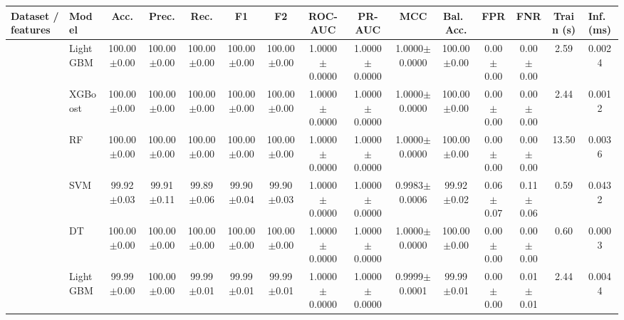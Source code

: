 \begin{tabular}{@{}llccccccccccccc@{}}
\toprule
\textbf{Dataset / features} & \textbf{Model} & \textbf{Acc.} & \textbf{Prec.} & \textbf{Rec.} & \textbf{F1} & \textbf{F2} & \textbf{ROC-AUC} & \textbf{PR-AUC} & \textbf{MCC} & \textbf{Bal.\ Acc.} & \textbf{FPR} & \textbf{FNR} & \textbf{Train (s)} & \textbf{Inf.\ (ms)}\\
\midrule
{} & LightGBM & 100.00{\tiny$\pm$0.00} & 100.00{\tiny$\pm$0.00} & 100.00{\tiny$\pm$0.00} & 100.00{\tiny$\pm$0.00} & 100.00{\tiny$\pm$0.00} & 1.0000{\tiny$\pm$0.0000} & 1.0000{\tiny$\pm$0.0000} & 1.0000{\tiny$\pm$0.0000} & 100.00{\tiny$\pm$0.00} & 0.00{\tiny$\pm$0.00} & 0.00{\tiny$\pm$0.00} & 2.59 & 0.0024\\
 & XGBoost & 100.00{\tiny$\pm$0.00} & 100.00{\tiny$\pm$0.00} & 100.00{\tiny$\pm$0.00} & 100.00{\tiny$\pm$0.00} & 100.00{\tiny$\pm$0.00} & 1.0000{\tiny$\pm$0.0000} & 1.0000{\tiny$\pm$0.0000} & 1.0000{\tiny$\pm$0.0000} & 100.00{\tiny$\pm$0.00} & 0.00{\tiny$\pm$0.00} & 0.00{\tiny$\pm$0.00} & 2.44 & 0.0012\\
 & RF & 100.00{\tiny$\pm$0.00} & 100.00{\tiny$\pm$0.00} & 100.00{\tiny$\pm$0.00} & 100.00{\tiny$\pm$0.00} & 100.00{\tiny$\pm$0.00} & 1.0000{\tiny$\pm$0.0000} & 1.0000{\tiny$\pm$0.0000} & 1.0000{\tiny$\pm$0.0000} & 100.00{\tiny$\pm$0.00} & 0.00{\tiny$\pm$0.00} & 0.00{\tiny$\pm$0.00} & 13.50 & 0.0036\\
 & SVM & 99.92{\tiny$\pm$0.03} & 99.91{\tiny$\pm$0.11} & 99.89{\tiny$\pm$0.06} & 99.90{\tiny$\pm$0.04} & 99.90{\tiny$\pm$0.03} & 1.0000{\tiny$\pm$0.0000} & 1.0000{\tiny$\pm$0.0000} & 0.9983{\tiny$\pm$0.0006} & 99.92{\tiny$\pm$0.02} & 0.06{\tiny$\pm$0.07} & 0.11{\tiny$\pm$0.06} & 0.59 & 0.0432\\
 & DT & 100.00{\tiny$\pm$0.00} & 100.00{\tiny$\pm$0.00} & 100.00{\tiny$\pm$0.00} & 100.00{\tiny$\pm$0.00} & 100.00{\tiny$\pm$0.00} & 1.0000{\tiny$\pm$0.0000} & 1.0000{\tiny$\pm$0.0000} & 1.0000{\tiny$\pm$0.0000} & 100.00{\tiny$\pm$0.00} & 0.00{\tiny$\pm$0.00} & 0.00{\tiny$\pm$0.00} & 0.60 & 0.0003\\
\midrule
{} & LightGBM & 99.99{\tiny$\pm$0.00} & 100.00{\tiny$\pm$0.00} & 99.99{\tiny$\pm$0.01} & 99.99{\tiny$\pm$0.01} & 99.99{\tiny$\pm$0.01} & 1.0000{\tiny$\pm$0.0000} & 1.0000{\tiny$\pm$0.0000} & 0.9999{\tiny$\pm$0.0001} & 99.99{\tiny$\pm$0.01} & 0.00{\tiny$\pm$0.00} & 0.01{\tiny$\pm$0.01} & 2.44 & 0.0044\\

\end{tabular}
